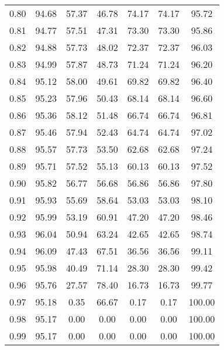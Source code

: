 \begin{tabular}{|c|c|c|c|c|c|c|}
      0.80 &     94.68 &     57.37 &      46.78 &   74.17 &      74.17 &         95.72 \\
      0.81 &     94.77 &     57.51 &      47.31 &   73.30 &      73.30 &         95.86 \\
      0.82 &     94.88 &     57.73 &      48.02 &   72.37 &      72.37 &         96.03 \\
      0.83 &     94.99 &     57.87 &      48.73 &   71.24 &      71.24 &         96.20 \\
      0.84 &     95.12 &     58.00 &      49.61 &   69.82 &      69.82 &         96.40 \\
      0.85 &     95.23 &     57.96 &      50.43 &   68.14 &      68.14 &         96.60 \\
      0.86 &     95.36 &     58.12 &      51.48 &   66.74 &      66.74 &         96.81 \\
      0.87 &     95.46 &     57.94 &      52.43 &   64.74 &      64.74 &         97.02 \\
      0.88 &     95.57 &     57.73 &      53.50 &   62.68 &      62.68 &         97.24 \\
      0.89 &     95.71 &     57.52 &      55.13 &   60.13 &      60.13 &         97.52 \\
      0.90 &     95.82 &     56.77 &      56.68 &   56.86 &      56.86 &         97.80 \\
      0.91 &     95.93 &     55.69 &      58.64 &   53.03 &      53.03 &         98.10 \\
      0.92 &     95.99 &     53.19 &      60.91 &   47.20 &      47.20 &         98.46 \\
      0.93 &     96.04 &     50.94 &      63.24 &   42.65 &      42.65 &         98.74 \\
      0.94 &     96.09 &     47.43 &      67.51 &   36.56 &      36.56 &         99.11 \\
      0.95 &     95.98 &     40.49 &      71.14 &   28.30 &      28.30 &         99.42 \\
      0.96 &     95.76 &     27.57 &      78.40 &   16.73 &      16.73 &         99.77 \\
      0.97 &     95.18 &      0.35 &      66.67 &    0.17 &       0.17 &        100.00 \\
      0.98 &     95.17 &      0.00 &       0.00 &    0.00 &       0.00 &        100.00 \\
      0.99 &     95.17 &      0.00 &       0.00 &    0.00 &       0.00 &        100.00 \\
\bottomrule
\end{tabular}
